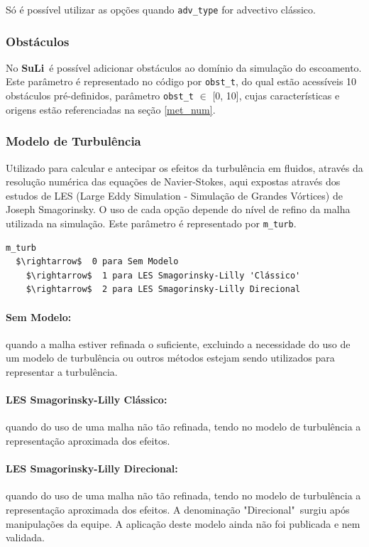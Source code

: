 \documentclass[12pt, a4paper]{article}
\newcommand{\SL}{{\bf SuLi}}
\begin{document}
\vspace{0.5cm}
\noindent *Só é possível utilizar as opções quando \verb|adv_type| for advectivo clássico.

\subsubsection{Obstáculos} \label{obst}
No \SL\ é possível adicionar obstáculos ao domínio da simulação do escoamento. Este parâmetro é representado no código por \verb|obst_t|, do qual estão acessíveis 10 obstáculos pré-definidos, parâmetro \verb|obst_t| $\in$ [0, 10], cujas características e origens estão referenciadas na seção \ref{met_num}.

\subsubsection{Modelo de Turbulência}
Utilizado para calcular e antecipar os efeitos da turbulência em fluidos, através da resolução numérica das equações de Navier-Stokes, aqui expostas através dos estudos de LES (Large Eddy Simulation - Simulação de Grandes Vórtices) de Joseph Smagorinsky. O uso de cada opção depende do nível de refino da malha utilizada na simulação. Este parâmetro é representado por \verb|m_turb|.
\begin{lstlisting}[escapeinside='']
m_turb  
  $\rightarrow$  0 para Sem Modelo
	$\rightarrow$  1 para LES Smagorinsky-Lilly 'Clássico'
	$\rightarrow$  2 para LES Smagorinsky-Lilly Direcional
\end{lstlisting}

\paragraph{Sem Modelo:} quando a malha estiver refinada o suficiente, excluindo a necessidade do uso de um modelo de turbulência ou outros métodos estejam sendo utilizados para representar a turbulência.
\paragraph{LES Smagorinsky-Lilly Clássico:} quando do uso de uma malha não tão refinada, tendo no modelo de turbulência a representação aproximada dos efeitos.
\paragraph{LES Smagorinsky-Lilly Direcional:} quando do uso de uma malha não tão refinada, tendo no modelo de turbulência a representação aproximada dos efeitos. A denominação "Direcional"\ surgiu após manipulações da equipe. A aplicação deste modelo ainda não foi publicada e nem validada.
\end{document}
